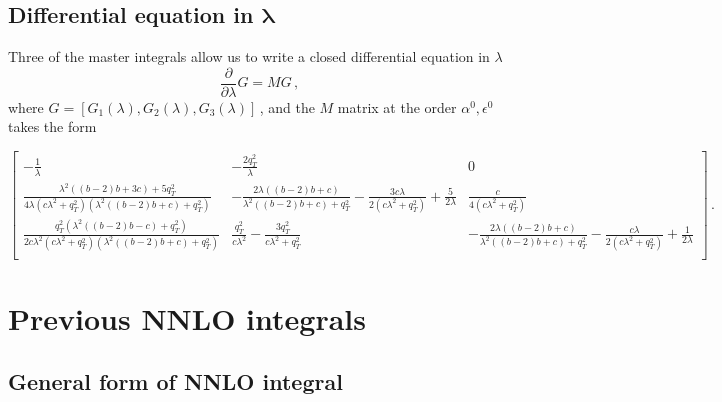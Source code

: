 \documentclass[a4paper,11pt]{article}
\numberwithin{equation}{section}
\begin{document}
\subsection{Differential equation in $\mathbold{\lambda}$}

Three of the master integrals allow us to write a closed differential equation
in
$\lambda$
%
\begin{equation}
  \frac{\partial}{\partial \lambda} G = M G\,,
\end{equation}
%
where $G = [G_1(\lambda),G_2(\lambda),G_3(\lambda)]$\,,
%
and the $M$ matrix at the order $\alpha^0, \epsilon^0$ takes the form
 
\begin{equation}
\left[
\begin{array}{ccc}
 -\frac{1}{\lambda } & -\frac{2 q_T^2}{\lambda } & 0 \\[1em]
 \frac{\lambda ^2 ((b-2) b+3 c)+5 q_T^2}{4 \lambda  \left(c \lambda
^2+q_T^2\right) \left(\lambda ^2 ((b-2) b+c)+q_T^2\right)} &
   -\frac{2 \lambda  ((b-2) b+c)}{\lambda ^2 ((b-2) b+c)+q_T^2}-\frac{3 c
\lambda }{2 \left(c \lambda ^2+q_T^2\right)}+\frac{5}{2 \lambda
   } & \frac{c}{4 \left(c \lambda ^2+q_T^2\right)} \\[1em]
 \frac{q_T^2 \left(\lambda ^2 ((b-2) b-c)+q_T^2\right)}{2 c \lambda
^2 \left(c \lambda ^2+q_T^2\right) \left(\lambda ^2 ((b-2)
   b+c)+q_T^2\right)} & \frac{q_T^2}{c \lambda ^2}-\frac{3 q_T^2}{c \lambda
^2+q_T^2} & -\frac{2 \lambda  ((b-2) b+c)}{\lambda ^2 ((b-2)
   b+c)+q_T^2}-\frac{c \lambda }{2 \left(c \lambda
^2+q_T^2\right)}+\frac{1}{2 \lambda } \\
\end{array}
\right]\,.
  \nonumber
\end{equation}

\section{Previous NNLO integrals}

\subsection{General form of NNLO integral}
\end{document}
